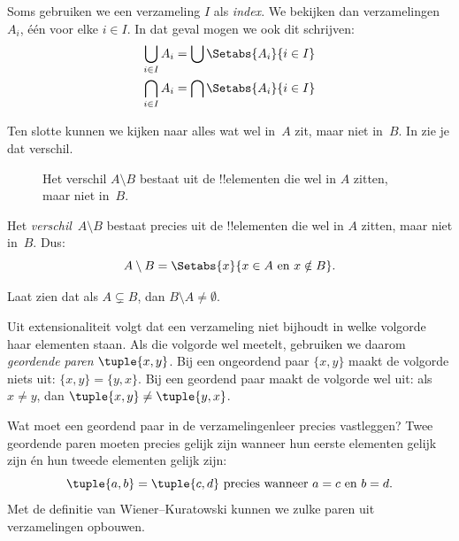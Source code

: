 \documentclass[openany]{memoir}
\begin{document}
Soms gebruiken we een verzameling $I$ als \emph{index}. We bekijken dan
verzamelingen $A_i$, één voor elke $i \in I$. In dat geval mogen we ook dit
schrijven:
\begin{align*}
	\bigcup_{i \in I} A_i & = \bigcup \Setabs{A_i }{i \in I}\\
	\bigcap_{i \in I} A_i & = \bigcap\Setabs{A_i}{i \in I}
\end{align*}

Ten slotte kunnen we kijken naar alles wat wel in~$A$ zit, maar niet in~$B$.
In  zie je dat verschil.

\begin{figure}
  \caption{Het verschil $A \setminus B$ bestaat uit de !!{element}en die wel
    in $A$ zitten, maar niet in~$B$.}
\end{figure}

\begin{defn}[Verschil]
Het \emph{verschil}~$A \setminus B$ bestaat precies uit de !!{element}en die
wel in $A$ zitten, maar niet in~$B$. Dus:
\[
A\setminus B = \Setabs{x}{x\in A \text{ en } x \notin B}.
\]
\end{defn}

\begin{prob}
	Laat zien dat als $A \subsetneq B$, dan $B \setminus A \neq \emptyset$.
\end{prob}
\endgroup

\begingroup
\def\olfilename{OLP-0009}
\def\olfilepath{content/sets-functions-relations/sets/}
\hypertarget{unit-OLP-0009}{}




\begin{explain}
Uit extensionaliteit volgt dat een verzameling niet bijhoudt in welke
volgorde haar elementen staan. Als die volgorde wel meetelt, gebruiken
we daarom \emph{geordende paren} $\tuple{x, y}$. Bij een ongeordend
paar $\{x, y\}$ maakt de volgorde niets uit: $\{x, y\} = \{y, x\}$.
Bij een geordend paar maakt de volgorde wel uit: als $x \neq y$, dan
$\tuple{x, y} \neq \tuple{y, x}$.

Wat moet een geordend paar in de verzamelingenleer precies vastleggen?
Twee geordende paren moeten precies gelijk zijn wanneer hun eerste
elementen gelijk zijn én hun tweede elementen gelijk zijn:
\[
  \tuple{a, b}= \tuple{c, d}\text{ precies wanneer }a = c \text{ en }b=d.
\]
Met de definitie van Wiener--Kuratowski kunnen we zulke paren uit
verzamelingen opbouwen.
\end{explain}
\end{document}
